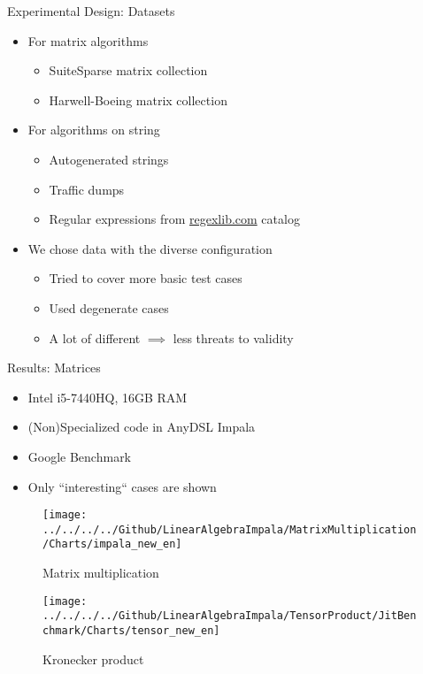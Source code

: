 \documentclass{beamer}
\begin{document}
\begin{frame}{Experimental Design: Datasets}
	
	\begin{itemize}
		\item For matrix algorithms 
		\begin{itemize}
			\item SuiteSparse matrix collection
			\item Harwell-Boeing matrix collection
		\end{itemize} \vfill
		
		\item For algorithms on string
		\begin{itemize}
			\item Autogenerated strings
			\item Traffic dumps
			\item Regular expressions from \url{regexlib.com} catalog
		\end{itemize}\vfill
		
		\item We chose data with the diverse configuration
		\begin{itemize}
			\item Tried to cover more basic test cases
			\item Used degenerate cases
			\item A lot of different $\implies$ less threats to validity
		\end{itemize}
		
	\end{itemize}
	
\end{frame}


\begin{frame}{Results: Matrices}
\begin{itemize}
	\item Intel i5-7440HQ, 16GB RAM
	\item (Non)Specialized code in AnyDSL Impala
	\item Google Benchmark
	\item Only ``interesting`` cases are shown
\end{itemize} \vfill

\begin{figure}
		\begin{minipage}{.5\textwidth}
			\texttt{[image: ../../../../Github/LinearAlgebraImpala/MatrixMultiplication/Charts/impala\_new\_en]} 
			\caption*{\small Matrix multiplication}
		\end{minipage}\hfill
		\begin{minipage}{.5\textwidth}
			\texttt{[image: ../../../../Github/LinearAlgebraImpala/TensorProduct/JitBenchmark/Charts/tensor\_new\_en]}
			\caption*{\small Kronecker product}
		\end{minipage}
\end{figure}
\end{frame}
\end{document}

